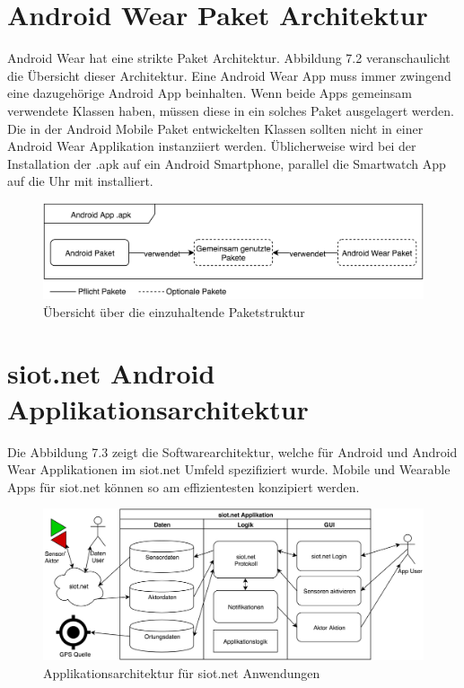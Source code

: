 \section{Android Wear Paket Architektur}
Android Wear hat eine strikte Paket Architektur. Abbildung 7.2 veranschaulicht die Übersicht dieser Architektur. Eine Android Wear App muss immer zwingend eine dazugehörige Android App beinhalten. Wenn beide Apps gemeinsam verwendete Klassen haben, müssen diese in ein solches Paket ausgelagert werden. Die in der Android Mobile Paket entwickelten Klassen sollten nicht in einer Android Wear Applikation instanziiert werden. Üblicherweise wird bei der Installation der .apk auf ein Android Smartphone, parallel die Smartwatch App auf die Uhr mit installiert.
\begin{figure}[h]
  \centering
  \includegraphics[scale=0.4]{98_Bilder/07_Architektur/AndroidPaketArchitektur}
  \caption[Übersicht Android Wear Paket Architektur]{Übersicht über die einzuhaltende Paketstruktur}
\end{figure}
\section{siot.net Android Applikationsarchitektur}
Die Abbildung 7.3 zeigt die Softwarearchitektur, welche für Android und Android Wear Applikationen im siot.net Umfeld spezifiziert wurde. Mobile und Wearable Apps für siot.net können so am effizientesten konzipiert werden.
\begin{figure}[h]
  \centering
  \includegraphics[scale=0.3]{98_Bilder/07_Architektur/siotAppArchitektur}
  \caption[Übersicht siot.net Applikationsarchitektur]{Applikationsarchitektur für siot.net Anwendungen}
\end{figure}
\newpage
